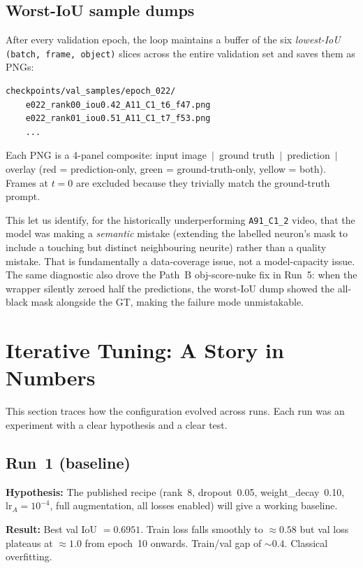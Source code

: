 \documentclass[11pt,a4paper]{article}
\begin{document}
\subsection{Worst-IoU sample dumps}

After every validation epoch, the loop maintains a buffer of the six
\emph{lowest-IoU} \texttt{(batch, frame, object)} slices across the
entire validation set and saves them as PNGs:
\begin{verbatim}
checkpoints/val_samples/epoch_022/
    e022_rank00_iou0.42_A11_C1_t6_f47.png
    e022_rank01_iou0.51_A11_C1_t7_f53.png
    ...
\end{verbatim}
Each PNG is a 4-panel composite: input image $\,|\,$ ground truth
$\,|\,$ prediction $\,|\,$ overlay (red = prediction-only, green =
ground-truth-only, yellow = both). Frames at $t{=}0$ are excluded
because they trivially match the ground-truth prompt.

This let us identify, for the historically underperforming
\texttt{A91\_C1\_2} video, that the model was making a \emph{semantic}
mistake (extending the labelled neuron's mask to include a touching
but distinct neighbouring neurite) rather than a quality mistake.
That is fundamentally a data-coverage issue, not a model-capacity
issue. The same diagnostic also drove the Path~B obj-score-nuke fix
in Run~5: when the wrapper silently zeroed half the predictions, the
worst-IoU dump showed the all-black mask alongside the GT, making the
failure mode unmistakable.

\section{Iterative Tuning: A Story in Numbers}
\label{sec:journey}

This section traces how the configuration evolved across runs. Each
run was an experiment with a clear hypothesis and a clear test.

\subsection{Run~1 (baseline)}

\textbf{Hypothesis:} The published recipe (rank~8, dropout~0.05,
weight\_decay~0.10, $\mathrm{lr}_A{=}10^{-4}$, full augmentation,
all losses enabled) will give a working baseline.

\textbf{Result:} Best val IoU $= 0.6951$. Train loss falls smoothly to
$\approx 0.58$ but val loss plateaus at $\approx 1.0$ from epoch~10
onwards. Train/val gap of $\sim 0.4$. Classical overfitting.
\end{document}
